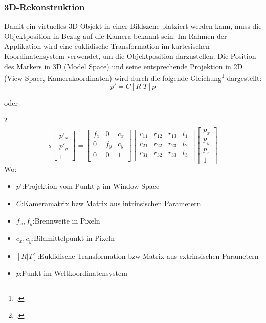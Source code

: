 \subsubsection{3D-Rekonstruktion}\label{sssec2drekonstruktion}
Damit ein virtuelles 3D-Objekt in einer Bildszene platziert werden kann, muss die Objektposition in Bezug auf die Kamera bekannt sein. Im Rahmen der Applikation wird eine euklidische Transformation im kartesischen Koordinatensystem verwendet, um die Objektposition darzustellen. Die Position des Markers in 3D (Model Space) und seine entsprechende Projektion in 2D (View Space, Kamerakoordinaten) wird durch die folgende Gleichung\footcite[Vgl.][\ac{S} 76]{Baggio2012} dargestellt:
\Large $$p' = C[R|T]p$$
\normalsize
\centerline{oder}\footcite{opencv3DReconstruction}
\begin{equation*}
s
\begin{bmatrix}
p'_{x}\\
p'_{y}\\
1
\end{bmatrix}
=
\begin{bmatrix}
f_{x} & 0 & c_{x}\\
0 & f_{y} & c_{y}\\
0 & 0 & 1\\
\end{bmatrix}
\begin{bmatrix}
r_{11} & r_{12} & r_{13} & t_{1}\\
r_{21} & r_{22} & r_{23} & t_{2}\\
r_{31} & r_{32} & r_{33} & t_{3}\\
\end{bmatrix}
\begin{bmatrix}
p_{x}\\
p_{y}\\
p_{z}\\
1
\end{bmatrix}
\end{equation*}
Wo:
\begin{itemize}[label=]
    \item $p'$:\hspace{1.1cm}Projektion vom Punkt $p$ im Window Space
    \item $C$:\hspace{1.1cm}Kameramatrix \acs{bzw} Matrix aus intrinsischen Parametern
    \item $f_{x}, f_{y}$:\hspace{0.5cm}Brennweite in Pixeln
    \item $c_{x}, c_{y}$:\hspace{0.5cm}Bildmittelpunkt in Pixeln
    \item $[R|T]$:\hspace{0.5cm}Euklidische Transformation \acs{bzw} Matrix aus extrinsischen Parametern
    \item $p$:\hspace{1.2cm}Punkt im Weltkoordinatensystem
\end{itemize}

